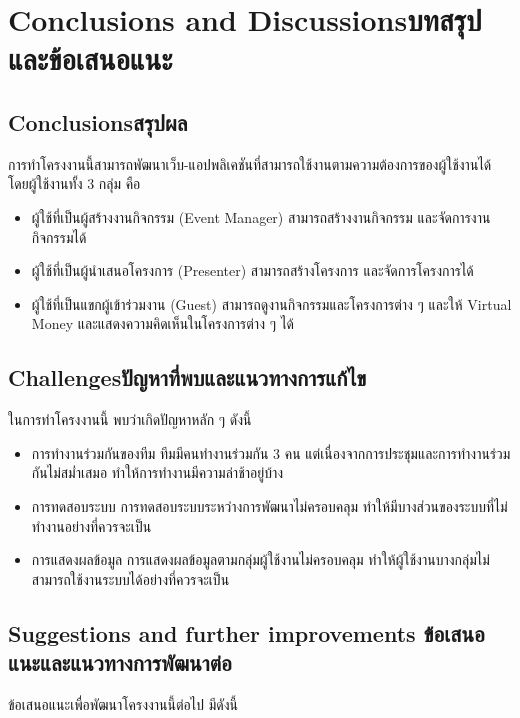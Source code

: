 \chapter{\ifenglish Conclusions and Discussions\else บทสรุปและข้อเสนอแนะ\fi}

\section{\ifenglish Conclusions\else สรุปผล\fi}
การทําโครงงานนี้สามารถพัฒนาเว็บ-แอปพลิเคชันที่สามารถใช้งานตามความต้องการของผู้ใช้งานได้
โดยผู้ใช้งานทั้ง 3 กลุ่ม คือ
\begin{itemize}
      \item ผู้ใช้ที่เป็นผู้สร้างงานกิจกรรม (Event Manager)
            สามารถสร้างงานกิจกรรม และจัดการงานกิจกรรมได้
      \item ผู้ใช้ที่เป็นผู้นำเสนอโครงการ (Presenter)
            สามารถสร้างโครงการ และจัดการโครงการได้
      \item ผู้ใช้ที่เป็นแขกผู้เข้าร่วมงาน (Guest)
            สามารถดูงานกิจกรรมและโครงการต่าง ๆ และให้ Virtual Money และแสดงความคิดเห็นในโครงการต่าง ๆ ได้
\end{itemize}
\section{\ifenglish Challenges\else ปัญหาที่พบและแนวทางการแก้ไข\fi}
ในการทำโครงงานนี้ พบว่าเกิดปัญหาหลัก ๆ ดังนี้

\begin{itemize}
      \item การทำงานร่วมกันของทีม
            ทีมมีคนทำงานร่วมกัน 3 คน แต่เนื่องจากการประชุมและการทำงานร่วมกันไม่สม่ำเสมอ ทำให้การทำงานมีความล่าช้าอยู่บ้าง
      \item การทดสอบระบบ
            การทดสอบระบบระหว่างการพัฒนาไม่ครอบคลุม ทำให้มีบางส่วนของระบบที่ไม่ทำงานอย่างที่ควรจะเป็น
      \item การแสดงผลข้อมูล
            การแสดงผลข้อมูลตามกลุ่มผู้ใช้งานไม่ครอบคลุม ทำให้ผู้ใช้งานบางกลุ่มไม่สามารถใช้งานระบบได้อย่างที่ควรจะเป็น
\end{itemize}

\section{\ifenglish%
        Suggestions and further improvements
  \else%
        ข้อเสนอแนะและแนวทางการพัฒนาต่อ
  \fi
 }

ข้อเสนอแนะเพื่อพัฒนาโครงงานนี้ต่อไป มีดังนี้


